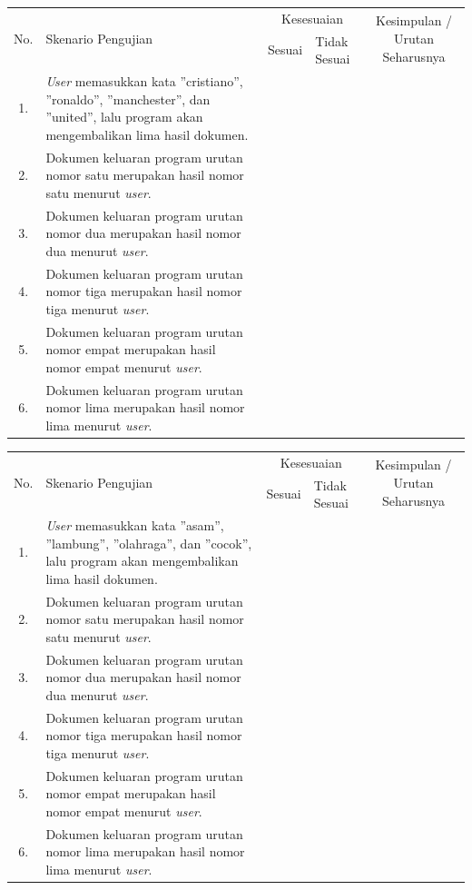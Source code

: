 \documentclass[12pt]{report}
\begin{document}
\begin{center}
\begin{tabular}{ |c|    m{6cm}         |c|m{1cm}| c |  }
\hline
\multirow{2}{*}{No.} & \multirow{2}{6cm}{Skenario Pengujian} & \multicolumn{2}{c|}{Kesesuaian} &\multirow{2}{2.3cm}{Kesimpulan / Urutan Seharusnya} \\\cline{3-4}
	&			& Sesuai	&	Tidak Sesuai   	&		\\
 \hline
1.&\textit{User} memasukkan kata ''cristiano'', ''ronaldo'', ''manchester'', dan ''united'', lalu program akan mengembalikan lima hasil dokumen.&	&	& \\
\hline
 2.&Dokumen keluaran program urutan nomor satu merupakan hasil nomor satu menurut \textit{user}.&	&	& \\
 \hline
 3.&Dokumen keluaran program urutan nomor dua merupakan hasil nomor dua menurut \textit{user}.&	&	& \\
 \hline
 4.&Dokumen keluaran program urutan nomor tiga merupakan hasil nomor tiga menurut \textit{user}.&	&	& \\
 \hline
5.&Dokumen keluaran program urutan nomor empat merupakan hasil nomor empat menurut \textit{user}.&	&	& \\
 \hline
6.&Dokumen keluaran program urutan nomor lima merupakan hasil nomor lima menurut \textit{user}.&	&	& \\
 \hline
\end{tabular}
\end{center}

\begin{center}
\begin{tabular}{ |c|    m{6cm}         |c|m{1cm}| c |  }
\hline
\multirow{2}{*}{No.} & \multirow{2}{6cm}{Skenario Pengujian} & \multicolumn{2}{c|}{Kesesuaian} &\multirow{2}{2.3cm}{Kesimpulan / Urutan Seharusnya} \\\cline{3-4}
	&			& Sesuai	&	Tidak Sesuai   	&		\\
 \hline
1.&\textit{User} memasukkan kata ''asam'', ''lambung'', ''olahraga'', dan ''cocok'', lalu program akan mengembalikan lima hasil dokumen.&	&	& \\
\hline
 2.&Dokumen keluaran program urutan nomor satu merupakan hasil nomor satu menurut \textit{user}.&	&	& \\
 \hline
 3.&Dokumen keluaran program urutan nomor dua merupakan hasil nomor dua menurut \textit{user}.&	&	& \\
 \hline
 4.&Dokumen keluaran program urutan nomor tiga merupakan hasil nomor tiga menurut \textit{user}.&	&	& \\
 \hline
5.&Dokumen keluaran program urutan nomor empat merupakan hasil nomor empat menurut \textit{user}.&	&	& \\
 \hline
6.&Dokumen keluaran program urutan nomor lima merupakan hasil nomor lima menurut \textit{user}.&	&	& \\
 \hline
\end{tabular}
\end{center}
\end{document}
